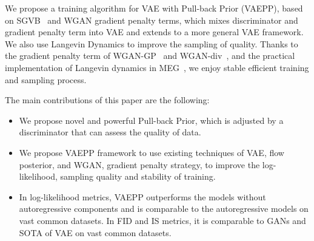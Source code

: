 We propose a training algorithm for VAE with Pull-back Prior (VAEPP), based on SGVB~\cite{kingma2014auto} and WGAN gradient penalty terms, which mixes discriminator and gradient penalty term into VAE and extends to a more general VAE framework. We also use Langevin Dynamics to improve the sampling of quality. 
Thanks to the gradient penalty term of WGAN-GP~\cite{gulrajani2017improved} and WGAN-div~\cite{wu2018wasserstein}, and the practical implementation of Langevin dynamics in MEG~\cite{kumar2019maximum}, we enjoy stable efficient training and sampling process. 

The main contributions of this paper are the following:
\begin{itemize}
	\item We propose novel and powerful Pull-back Prior, which is adjusted by a discriminator that can assess the quality of data. 
	\item We propose VAEPP framework to use existing techniques of VAE, \EG flow posterior, and WGAN, \EG gradient penalty strategy, to improve the log-likelihood, sampling quality and stability of training. 
	\item In log-likelihood metrics, VAEPP outperforms the models without autoregressive components and is comparable to the autoregressive models on vast common datasets. In FID and IS metrics, it is comparable to GANs and SOTA of VAE on vast common datasets. 
\end{itemize}
